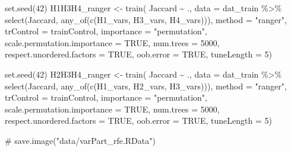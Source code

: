 \documentclass[
  letterpaper,
  DIV=11,
  numbers=noendperiod]{scrartcl}
\newenvironment{Shaded}{\begin{snugshade}}{\end{snugshade}}
\newcommand{\AttributeTok}[1]{\textcolor[rgb]{0.40,0.45,0.13}{#1}}
\newcommand{\CommentTok}[1]{\textcolor[rgb]{0.37,0.37,0.37}{#1}}
\newcommand{\ConstantTok}[1]{\textcolor[rgb]{0.56,0.35,0.01}{#1}}
\newcommand{\DecValTok}[1]{\textcolor[rgb]{0.68,0.00,0.00}{#1}}
\newcommand{\FunctionTok}[1]{\textcolor[rgb]{0.28,0.35,0.67}{#1}}
\newcommand{\NormalTok}[1]{\textcolor[rgb]{0.00,0.23,0.31}{#1}}
\newcommand{\OtherTok}[1]{\textcolor[rgb]{0.00,0.23,0.31}{#1}}
\newcommand{\SpecialCharTok}[1]{\textcolor[rgb]{0.37,0.37,0.37}{#1}}
\newcommand{\StringTok}[1]{\textcolor[rgb]{0.13,0.47,0.30}{#1}}
\begin{document}
\begin{Shaded}
\begin{Highlighting}[]
\FunctionTok{set.seed}\NormalTok{(}\DecValTok{42}\NormalTok{)}
\NormalTok{H1H3H4\_ranger }\OtherTok{\textless{}{-}} \FunctionTok{train}\NormalTok{(}
\NormalTok{    Jaccard }\SpecialCharTok{\textasciitilde{}}\NormalTok{ .,}
    \AttributeTok{data =}\NormalTok{ dat\_train }\SpecialCharTok{\%\textgreater{}\%} \FunctionTok{select}\NormalTok{(Jaccard, }\FunctionTok{any\_of}\NormalTok{(}\FunctionTok{c}\NormalTok{(H1\_vars, H3\_vars, H4\_vars))),}
    \AttributeTok{method =} \StringTok{"ranger"}\NormalTok{,}
    \AttributeTok{trControl =}\NormalTok{ trainControl,}
    \AttributeTok{importance =} \StringTok{"permutation"}\NormalTok{,}
    \AttributeTok{scale.permutation.importance =} \ConstantTok{TRUE}\NormalTok{,}
    \AttributeTok{num.trees =} \DecValTok{5000}\NormalTok{,}
    \AttributeTok{respect.unordered.factors =} \ConstantTok{TRUE}\NormalTok{,}
    \AttributeTok{oob.error =} \ConstantTok{TRUE}\NormalTok{,}
    \AttributeTok{tuneLength =} \DecValTok{5}\NormalTok{)}

\FunctionTok{set.seed}\NormalTok{(}\DecValTok{42}\NormalTok{)}
\NormalTok{H2H3H4\_ranger }\OtherTok{\textless{}{-}} \FunctionTok{train}\NormalTok{(}
\NormalTok{    Jaccard }\SpecialCharTok{\textasciitilde{}}\NormalTok{ .,}
    \AttributeTok{data =}\NormalTok{ dat\_train }\SpecialCharTok{\%\textgreater{}\%} \FunctionTok{select}\NormalTok{(Jaccard, }\FunctionTok{any\_of}\NormalTok{(}\FunctionTok{c}\NormalTok{(H1\_vars, H2\_vars, H3\_vars))),}
    \AttributeTok{method =} \StringTok{"ranger"}\NormalTok{,}
    \AttributeTok{trControl =}\NormalTok{ trainControl,}
    \AttributeTok{importance =} \StringTok{"permutation"}\NormalTok{,}
    \AttributeTok{scale.permutation.importance =} \ConstantTok{TRUE}\NormalTok{,}
    \AttributeTok{num.trees =} \DecValTok{5000}\NormalTok{,}
    \AttributeTok{respect.unordered.factors =} \ConstantTok{TRUE}\NormalTok{,}
    \AttributeTok{oob.error =} \ConstantTok{TRUE}\NormalTok{,}
    \AttributeTok{tuneLength =} \DecValTok{5}\NormalTok{)}

\CommentTok{\# save.image("data/varPart\_rfe.RData")}
\end{Highlighting}
\end{Shaded}
\end{document}
